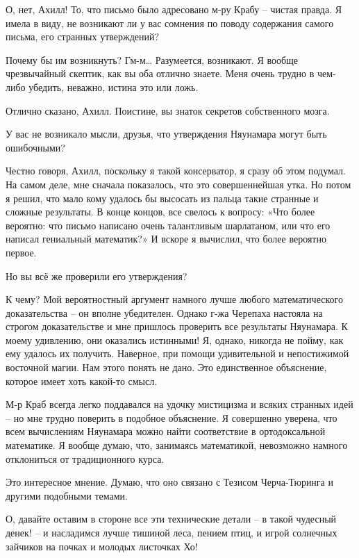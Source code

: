 \documentclass[../main.tex]{subfiles}
\begin{document}
\begin{dialogue}
 О, нет, Ахилл! То, что письмо было адресовано м-ру Крабу \--- чистая правда. Я имела в виду, не возникают ли у вас сомнения по поводу содержания самого письма, его странных утверждений?

 Почему бы им возникнуть? Гм-м\ldots{} Разумеется, возникают. Я вообще чрезвычайный скептик, как вы оба отлично знаете. Меня очень трудно в чем-либо убедить, неважно, истина это или ложь.

 Отлично сказано, Ахилл. Поистине, вы знаток секретов собственного мозга.

 У вас не возникало мысли, друзья, что утверждения Няунамара могут быть ошибочными?

 Честно говоря, Ахилл, поскольку я такой консерватор, я сразу об этом подумал. На самом деле, мне сначала показалось, что это совершеннейшая утка. Но потом я решил, что мало кому удалось бы высосать из пальца такие странные и сложные результаты. В конце концов, все свелось к вопросу: «Что более вероятно: что письмо написано очень талантливым шарлатаном, или что его написал гениальный математик?» И вскоре я вычислил, что более вероятно первое.

 Но вы всё же проверили его утверждения?

 К чему? Мой вероятностный аргумент намного лучше любого математического доказательства \--- он вполне убедителен. Однако г-жа Черепаха настояла на строгом доказательстве и мне пришлось проверить все результаты Няунамара. К моему удивлению, они оказались истинными! Я, однако, никогда не пойму, как ему удалось их получить. Наверное, при помощи удивительной и непостижимой восточной магии. Нам этого понять не дано. Это единственное объяснение, которое имеет хоть какой-то смысл.

 М-р Краб всегда легко поддавался на удочку мистицизма и всяких странных идей \--- но мне трудно поверить в подобное объяснение. Я совершенно уверена, что всем вычислениям Няунамара можно найти соответствие в ортодоксальной математике. Я вообще думаю, что, занимаясь математикой, невозможно намного отклониться от традиционного курса.

 Это интересное мнение. Думаю, что оно связано с Тезисом Черча-Тюринга и другими подобными темами.

 О, давайте оставим в стороне все эти технические детали \--- в такой чудесный денек! \--- и насладимся лучше тишиной леса, пением птиц, и игрой солнечных зайчиков на почках и молодых листочках Хо!


\end{dialogue}
\end{document}

